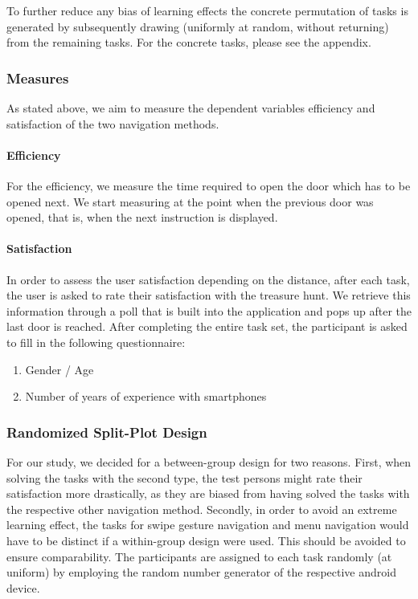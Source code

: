 \documentclass{sig-alternate-05-2015}
\begin{document}
To further reduce any bias of learning effects
the concrete permutation of tasks is generated by subsequently drawing
(uniformly at random, without returning) from the remaining tasks.
For the concrete tasks, please see the appendix.
\subsubsection{Measures}
As stated above, we aim to measure the dependent variables efficiency and satisfaction of the two navigation methods. 
\paragraph{Efficiency} For the efficiency, we measure the time required to open the door which has to be opened next. We start measuring at the point
when the previous door was opened, that is, when the next instruction is displayed.
\paragraph{Satisfaction}
In order to assess the user satisfaction depending on the distance, after each task, the user is asked to rate their
satisfaction with the treasure hunt. We retrieve this information through a poll that is built into the application and pops
up after the last door is reached.
After completing the entire task set, the participant is asked to fill in the following questionnaire:
\begin{enumerate}
  \item Gender / Age
  \item Number of years of experience with smartphones
\end{enumerate}

\subsubsection{Randomized Split-Plot Design}
For our study, we decided for a between-group design for two reasons.  First,
when solving the tasks with the second type, the test persons might rate their
satisfaction more drastically, as they are biased from having solved the tasks
with the respective other navigation method.  Secondly, in order to avoid an
extreme learning effect, the tasks for swipe gesture navigation and menu
navigation would have to be distinct if a within-group design were used. This
should be avoided to ensure comparability.  The participants are assigned to
each task randomly (at uniform) by employing the random number generator of
the respective android device.
\end{document}
